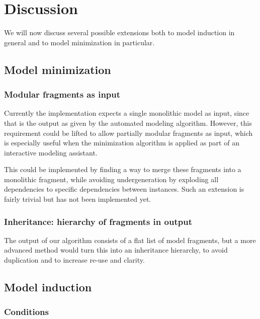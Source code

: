 \documentclass{article} %
\begin{document}

\section{Discussion}
\label{sec:discussion}
We will now discuss several possible extensions both to model induction in
general and to model minimization in particular.

\subsection{Model minimization}


\subsubsection{Modular fragments as input}

Currently the implementation expects a single monolithic model as input, since
that is the output as given by the automated modeling algorithm. However, this
requirement could be lifted to allow partially modular fragments as input,
which is especially useful when the minimization algorithm is applied as part
of an interactive modeling assistant.

This could be implemented by finding a way to merge these fragments into a
monolithic fragment, while avoiding undergeneration by exploding all
dependencies to specific dependencies between instances. Such an extension is
fairly trivial but has not been implemented yet.

\subsubsection{Inheritance: hierarchy of fragments in output}

The output of our algorithm consists of a flat list of model fragments, but a
more advanced method would turn this into an inheritance hierarchy, to avoid
duplication and to increase re-use and clarity.

\subsection{Model induction}

\subsubsection{Conditions}
\end{document}

